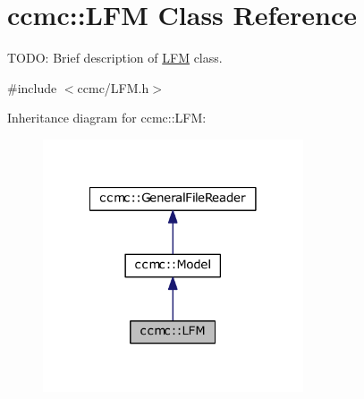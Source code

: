 \hypertarget{classccmc_1_1_l_f_m}{\section{ccmc\-:\-:L\-F\-M Class Reference}
\label{classccmc_1_1_l_f_m}
}


T\-O\-D\-O\-: Brief description of \hyperlink{classccmc_1_1_l_f_m}{L\-F\-M} class.  




{\ttfamily \#include $<$ccmc/\-L\-F\-M.\-h$>$}



Inheritance diagram for ccmc\-:\-:L\-F\-M\-:
\nopagebreak
\begin{figure}[H]
\begin{center}
\leavevmode
\includegraphics[width=218pt]{classccmc_1_1_l_f_m__inherit__graph}
\end{center}
\end{figure}


